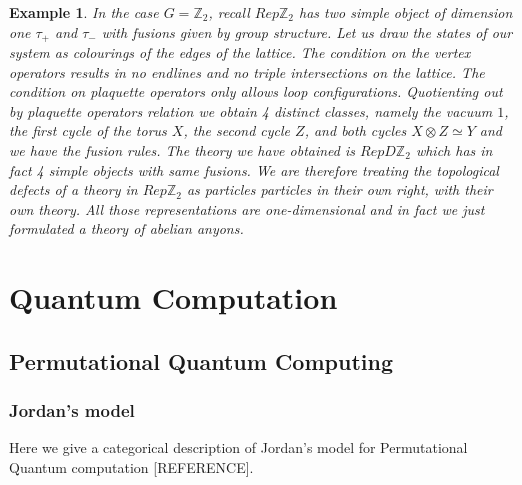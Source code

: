 \documentclass{article}
\newtheorem{example}{Example}
\begin{document}
\begin{example}
In the case $G=\mathbb{Z}_2$, recall $Rep\mathbb{Z}_2$ has two simple object of dimension one $\tau_+$ and $\tau_-$ with fusions given by group structure. Let us draw the states of our system as colourings of the edges of the lattice. The condition on the vertex operators results in no endlines and no triple intersections on the lattice. The condition on plaquette operators only allows loop configurations. Quotienting out by plaquette operators relation we obtain 4 distinct classes, namely the vacuum $1$, the first cycle of the torus $X$, the second cycle $Z$, and both cycles $X \otimes Z \simeq Y$ and we have the fusion rules. The theory we have obtained is $RepD\mathbb{Z}_2$ which has in fact 4 simple objects with same fusions. We are therefore treating the topological defects of a theory in $Rep\mathbb{Z}_2$ as particles particles in their own right, with their own theory. All those representations are one-dimensional and in fact we just formulated a theory of abelian anyons.
\end{example}



\section{Quantum Computation}


\subsection{Permutational Quantum Computing}
\subsubsection{Jordan's model}
Here we give a categorical description of Jordan's model for Permutational Quantum computation [REFERENCE].
\end{document}
